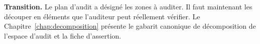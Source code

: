 \begin{boxinfo}
\textbf{Transition.} Le plan d'audit a désigné les zones à auditer. Il faut
maintenant les découper en éléments que l'auditeur peut réellement
vérifier. Le Chapitre~\ref{chap:decomposition} présente le gabarit canonique
de décomposition de l'espace d'audit et la fiche d'assertion.
\end{boxinfo}
